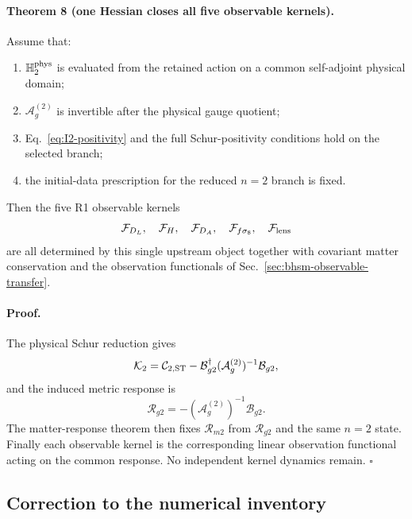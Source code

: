\paragraph{Theorem 8 (one Hessian closes all five observable kernels).}
Assume that:

\begin{enumerate}
\item $\mathbb H_2^{\rm phys}$ is evaluated from the retained action on a
      common self-adjoint physical domain;
\item $\mathcal A_g^{(2)}$ is invertible after the physical gauge quotient;
\item Eq.~\eqref{eq:I2-positivity} and the full Schur-positivity conditions
      hold on the selected branch;
\item the initial-data prescription for the reduced $n=2$ branch is fixed.
\end{enumerate}

Then the five R1 observable kernels
\begin{equation}
\mathcal F_{D_L},\quad
\mathcal F_H,\quad
\mathcal F_{D_A},\quad
\mathcal F_{f\sigma_8},\quad
\mathcal F_{\rm lens}
\end{equation}
are all determined by this single upstream object together with covariant
matter conservation and the observation functionals of
Sec.~\ref{sec:bhsm-observable-transfer}.

\paragraph{Proof.}
The physical Schur reduction gives
\begin{equation}
\mathcal K_2
=
\mathcal C_{2,\rm ST}
-
\mathcal B_{g2}^\dagger
(\mathcal A_g^{(2)})^{-1}
\mathcal B_{g2},
\end{equation}
and the induced metric response is
\begin{equation}
\mathcal R_{g2}
=
-(\mathcal A_g^{(2)})^{-1}\mathcal B_{g2}.
\end{equation}
The matter-response theorem then fixes $\mathcal R_{m2}$ from
$\mathcal R_{g2}$ and the same $n=2$ state.  Finally each observable kernel is
the corresponding linear observation functional acting on the common
response.  No independent kernel dynamics remain. \hfill$\square$

\subsection{Correction to the numerical inventory}

